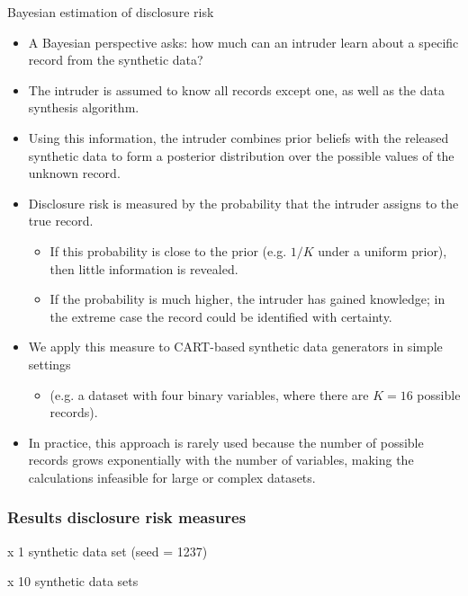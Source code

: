 \documentclass[t,8pt,utfx8]{beamer}
\begin{document}
\begin{spacing}{1.25}
\begin{frame}{Bayesian estimation of disclosure risk}
\begin{itemize}
    \item A Bayesian perspective asks: how much can an intruder learn about a specific record from the synthetic data? 
    \item The intruder is assumed to know all records except one, as well as the data synthesis algorithm.
    \item Using this information, the intruder combines prior beliefs with the released synthetic data to form a posterior distribution over the possible values of the unknown record.
    \item Disclosure risk is measured by the probability that the intruder assigns to the true record. 
    \begin{itemize}
        \item If this probability is close to the prior (e.g. $1/K$ under a uniform prior), then little information is revealed. 
        \item If the probability is much higher, the intruder has gained knowledge; in the extreme case the record could be identified with certainty.
    \end{itemize}
    \item We apply this measure to CART-based synthetic data generators in simple settings 
    \begin{itemize}
        \item (e.g. a dataset with four binary variables, where there are $K=16$ possible records).
    \end{itemize}
    \item In practice, this approach is rarely used because the number of possible records grows exponentially with the number of variables, making the calculations infeasible for large or complex datasets.
\end{itemize}
\end{frame}


\begin{frame}[t]\frametitle{Results disclosure risk measures}
\begin{minipage}[t]{0.48\textwidth}
    \begin{table}[]
        \centering
        \caption{x 1 synthetic data set (seed = 1237)}
        \resizebox{\textwidth}{!}{}
        \label{table:disclosure_risk_1}
    \end{table}
\end{minipage}%
\hfill%
\begin{minipage}[t]{0.48\textwidth}
    \begin{table}[]
        \centering
        \caption{x 10 synthetic data sets}
        \resizebox{\textwidth}{!}{}
        \label{table:disclosure_risk_10}
    \end{table}
\end{minipage}
\end{frame}




\end{spacing}
\end{document}
